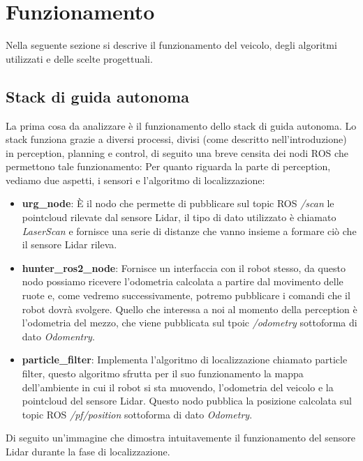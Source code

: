 \section{Funzionamento}
Nella seguente sezione si descrive il funzionamento del veicolo, degli algoritmi utilizzati e delle scelte progettuali.

\subsection{Stack di guida autonoma}
La prima cosa da analizzare è il funzionamento dello stack di guida autonoma.
Lo stack funziona grazie a diversi processi, divisi (come descritto nell'introduzione) in perception, planning e control, di seguito una breve censita dei nodi ROS che permettono tale funzionamento:
Per quanto riguarda la parte di perception, vediamo due aspetti, i sensori e l'algoritmo di localizzazione:

\begin{itemize}
  \item \textbf{urg\_node}: È il nodo che permette di pubblicare sul topic ROS \textit{/scan} le pointcloud rilevate dal sensore Lidar, il tipo di dato utilizzato è chiamato \textit{LaserScan} e fornisce una serie di distanze che vanno insieme a formare ciò che il sensore Lidar rileva.
  \item \textbf{hunter\_ros2\_node}: Fornisce un interfaccia con il robot stesso, da questo nodo possiamo ricevere l'odometria calcolata a partire dal movimento delle ruote e, come vedremo successivamente, potremo pubblicare i comandi che il robot dovrà svolgere. Quello che interessa a noi al momento della perception è l'odometria del mezzo, che viene pubblicata sul tpoic \textit{/odometry} sottoforma di dato \textit{Odomentry}. 
  \item \textbf{particle\_filter}: Implementa l'algoritmo di localizzazione chiamato particle filter, questo algoritmo sfrutta per il suo funzionamento la mappa dell'ambiente in cui il robot si sta muovendo, l'odometria del veicolo e la pointcloud del sensore Lidar. Questo nodo pubblica la posizione calcolata sul topic ROS \textit{/pf/position} sottoforma di dato \textit{Odometry}.
\end{itemize}

\noindent Di seguito un'immagine che dimostra intuitavemente il funzionamento del sensore Lidar durante la fase di localizzazione.

